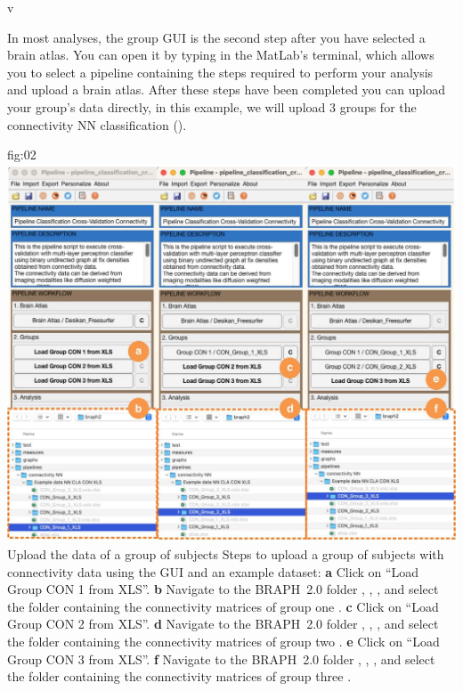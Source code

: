 v\documentclass[justified]{tufte-handout}
\begin{document}
In most analyses, the group GUI is the second step after you have selected a brain atlas. You can open it by typing  in the MatLab's terminal, which allows you to select a pipeline containing the steps required to perform your analysis and upload a brain atlas. After these steps have been completed you can upload your group's data directly, in this example, we will upload 3 groups for the connectivity NN classification (). 

	{fig:02}
	{
	\includegraphics{fig02.jpg}
	}
	{Upload the data of a group of subjects}
	{
	Steps to upload a group of subjects with connectivity data using the GUI and an example dataset: 
	{\bf a} Click on ``Load Group CON 1 from XLS''.
	{\bf b} Navigate to the BRAPH~2.0 folder , , , and select the folder containing the connectivity matrices of group one .
        {\bf c} Click on ``Load Group CON 2 from XLS''.
	{\bf d} Navigate to the BRAPH~2.0 folder , , , and select the folder containing the connectivity matrices of group two .
        {\bf e} Click on ``Load Group CON 3 from XLS''.
        {\bf f} Navigate to the BRAPH~2.0 folder , , , and select the folder containing the connectivity matrices of group three .
	}
\end{document}
